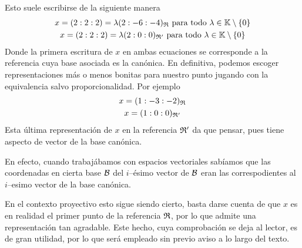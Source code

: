 \begin{exa}
	Esto suele escribirse de la siguiente manera
	\begin{gather*}
		x=(2:2:2)=\lambda(2:-6:-4)_{\mathfrak{R}}\text{ para todo } \lambda\in\mathbb{K}\setminus\{0\}\\
		x=(2:2:2)=\lambda(2:0:0)_{\mathfrak{R}'}\text{ para todo } \lambda\in\mathbb{K}\setminus\{0\}
	\end{gather*}
	Donde la primera escritura de $x$ en ambas ecuaciones se corresponde a la referencia cuya base asociada es la canónica. En definitiva, podemos escoger representaciones más o menos bonitas para nuestro punto jugando con la equivalencia salvo proporcionalidad. Por ejemplo
	\begin{gather*}
		x=(1:-3:-2)_{\mathfrak{R}}\\
		x=(1:0:0)_{\mathfrak{R}'}
	\end{gather*}
	Esta última representación de $x$ en la referencia $\mathfrak{R}'$ da que pensar, pues tiene aspecto de vector de la base canónica.
	
	 En efecto, cuando trabajábamos con espacios vectoriales sabíamos que las coordenadas en cierta base $\mathcal{B}$ del $i$--ésimo vector de $\mathcal{B}$ eran las correspodientes al $i$--esimo vector de la base canónica.
	 
	 En el contexto proyectivo esto sigue siendo cierto, basta darse cuenta de que $x$ es en realidad el primer punto de la referencia $\mathfrak{R}$, por lo que admite una representación tan agradable. Este hecho, cuya comprobación se deja al lector, es de gran utilidad, por lo que será empleado sin previo aviso a lo largo del texto. 
\end{exa}